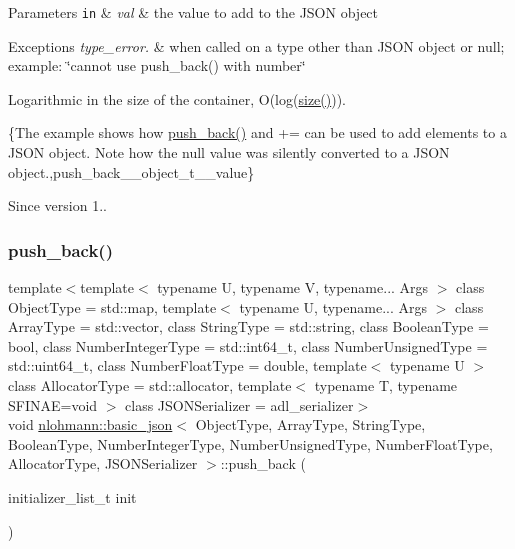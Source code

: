 \begin{DoxyParams}[1]{Parameters}
\mbox{\tt in}  & {\em val} & the value to add to the J\+S\+ON object\\
\hline
\end{DoxyParams}

\begin{DoxyExceptions}{Exceptions}
{\em type\+\_\+error.} & when called on a type other than J\+S\+ON object or null; example\+: {\ttfamily \char`\"{}cannot use push\+\_\+back() with number\char`\"{}}\\
\hline
\end{DoxyExceptions}
Logarithmic in the size of the container, O(log({\ttfamily \mbox{\hyperlink{classnlohmann_1_1basic__json_a25e27ad0c6d53c01871c5485e1f75b96}{size()}}})).

\{The example shows how {\ttfamily \mbox{\hyperlink{classnlohmann_1_1basic__json_ac8e523ddc8c2dd7e5d2daf0d49a9c0d7}{push\+\_\+back()}}} and {\ttfamily +=} can be used to add elements to a J\+S\+ON object. Note how the {\ttfamily null} value was silently converted to a J\+S\+ON object.,push\+\_\+back\+\_\+\+\_\+object\+\_\+t\+\_\+\+\_\+value\}

\begin{DoxySince}{Since}
version 1.. 
\end{DoxySince}
\mbox{\label{classnlohmann_1_1basic__json_a1be31ef2d2934d37a818083a4af44f99}} 
\subsubsection{\texorpdfstring{push\+\_\+back()}{push\_back()}\hspace{0.1cm}{\footnotesize\ttfamily [4/4]}}
{\footnotesize\ttfamily template$<$template$<$ typename U, typename V, typename... Args $>$ class Object\+Type = std\+::map, template$<$ typename U, typename... Args $>$ class Array\+Type = std\+::vector, class String\+Type  = std\+::string, class Boolean\+Type  = bool, class Number\+Integer\+Type  = std\+::int64\+\_\+t, class Number\+Unsigned\+Type  = std\+::uint64\+\_\+t, class Number\+Float\+Type  = double, template$<$ typename U $>$ class Allocator\+Type = std\+::allocator, template$<$ typename T, typename S\+F\+I\+N\+A\+E=void $>$ class J\+S\+O\+N\+Serializer = adl\+\_\+serializer$>$ \\
void \mbox{\hyperlink{classnlohmann_1_1basic__json}{nlohmann\+::basic\+\_\+json}}$<$ Object\+Type, Array\+Type, String\+Type, Boolean\+Type, Number\+Integer\+Type, Number\+Unsigned\+Type, Number\+Float\+Type, Allocator\+Type, J\+S\+O\+N\+Serializer $>$\+::push\+\_\+back (\begin{DoxyParamCaption}\item[{initializer\+\_\+list\+\_\+t}]{init }\end{DoxyParamCaption})\hspace{0.3cm}{\ttfamily [inline]}}



